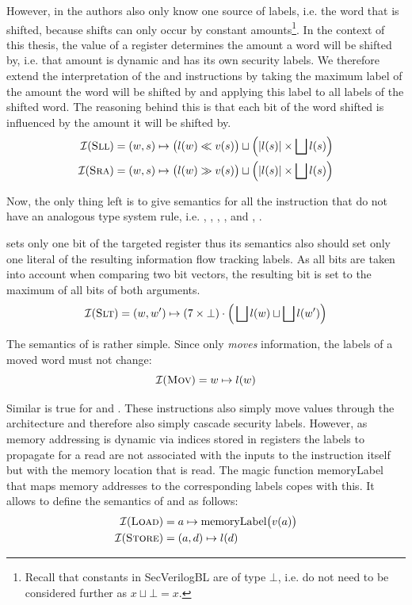 However, in \cite{Ferraiuolo17} the authors also only know one source of labels, i.e. the word that is shifted, because shifts can only occur by constant amounts\footnote{%
    Recall that constants in SecVerilogBL are of type $ \bot $, i.e. do not need to be considered further as $ x \sqcup \bot = x $.
}.
In the context of this thesis, the value of a register determines the amount a word will be shifted by, i.e. that amount is dynamic and has its own security labels.
We therefore extend the interpretation of the  and  instructions by taking the maximum label of the amount the word will be shifted by and applying this label to all labels of the shifted word.
The reasoning behind this is that each bit of the word shifted is influenced by the amount it will be shifted by.
\begin{align*}
    \mathcal{I}(\textsc{Sll}) &= (w, s) \mapsto \big(l(w) \ll v(s) \big) \sqcup \Big(|l(s)| \times \bigsqcup l(s) \Big) \\
    \mathcal{I}(\textsc{Sra}) &= (w, s) \mapsto \big(l(w) \gg v(s) \big) \sqcup \Big(|l(s)| \times \bigsqcup l(s) \Big)
\end{align*}

Now, the only thing left is to give semantics for all the instruction that do not have an analogous type system rule, i.e. , , , ,  and , .

 sets only one bit of the targeted register thus its semantics also should set only one literal of the resulting information flow tracking labels.
As all bits are taken into account when comparing two bit vectors, the resulting bit is set to the maximum of all bits of both arguments.
\begin{equation*}
    \mathcal{I}(\textsc{Slt}) = (w, w') \mapsto (7 \times \bot) \cdot \Big(\bigsqcup l(w) \sqcup \bigsqcup l(w') \Big)
\end{equation*}

The semantics of  is rather simple.
Since  only \textit{moves} information, the labels of a moved word must not change:
\begin{equation*}
    \mathcal{I}(\textsc{Mov}) = w \mapsto l(w)
\end{equation*}

Similar is true for  and .
These instructions also simply move values through the architecture and therefore also simply cascade security labels.
However, as memory addressing is dynamic via indices stored in registers the labels to propagate for a read are not associated with the inputs to the instruction itself but with the memory location that is read.
The magic function \mbox{memoryLabel} that maps memory addresses to the corresponding labels copes with this.
It allows to define the semantics of  and  as follows:
\begin{align*}
    \mathcal{I}(\textsc{Load}) &= a \mapsto \text{memoryLabel}\big(v(a) \big) \\
    \mathcal{I}(\textsc{Store}) &= (a, d) \mapsto l(d)
\end{align*}

